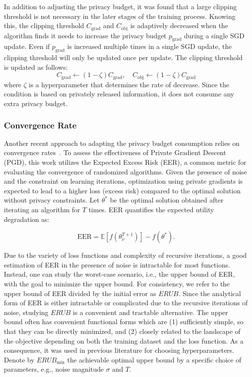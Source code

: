 In addition to adjusting the privacy budget, it was found that a large clipping threshold is not necessary in the later stages of the training process. Knowing this, the clipping threshold $C_\text{grad}$ and $C_\text{obj}$ is adaptively decreased when the algorithm finds it needs to increase the privacy budget $p_\text{grad}$ during a single SGD update. Even if $p_\text{grad}$ is increased multiple times in a single SGD update, the clipping threshold will only be updated once per update. The clipping threshold is updated as follows:
\[ C_{\text{grad}} \leftarrow (1-\zeta)C_{\text{grad}}, \quad C_{\text{obj}} \leftarrow (1-\zeta)C_{\text{grad}} \]
where $\zeta$ is a hyperparameter that determines the rate of decrease. Since the condition is based on privately released information, it does not consume any extra privacy budget.

\subsubsection{Convergence Rate}
Another recent approach to adapting the privacy budget consumption relies on convergence rates~\cite{RefWorks:RefID:49-hong2022dynamic}.
To assess the effectiveness of Private Gradient Descent (PGD), this work utilizes the Expected Excess Risk (EER), a common metric for evaluating the convergence of randomized algorithms. Given the presence of noise and the constraint on learning iterations, optimization using private gradients is expected to lead to a higher loss (excess risk) compared to the optimal solution without privacy constraints. Let \( \theta^* \) be the optimal solution obtained after iterating an algorithm  for \( T \) times. EER quantifies the expected utility degradation as:

\[
\text{EER} = \mathbb{E}[f(\theta_{\nu}^{T+1})] - f(\theta^*).
\]

Due to the variety of loss functions and complexity of recursive iterations, a good estimation of EER in the presence of noise is intractable for most functions. Instead, one can study the worst-case scenario, i.e., the upper bound of EER, with the goal to minimize the upper bound. For consistency, we refer to the upper bound of EER divided by the initial error as \( ERUB \). Since the analytical form of EER is either intractable or complicated due to the recursive iterations of noise, studying \( ERUB \) is a convenient and tractable alternative. The upper bound often has convenient functional forms which are (1) sufficiently simple, so that they can be directly minimized, and (2) closely related to the landscape of the objective depending on both the training dataset and the loss function. As a consequence, it was used in previous literature for choosing hyperparameters. Denote by \( ERUB_{\text{min}} \) the achievable optimal upper bound by a specific choice of parameters, e.g., noise magnitude \( \sigma \) and \( T \).

